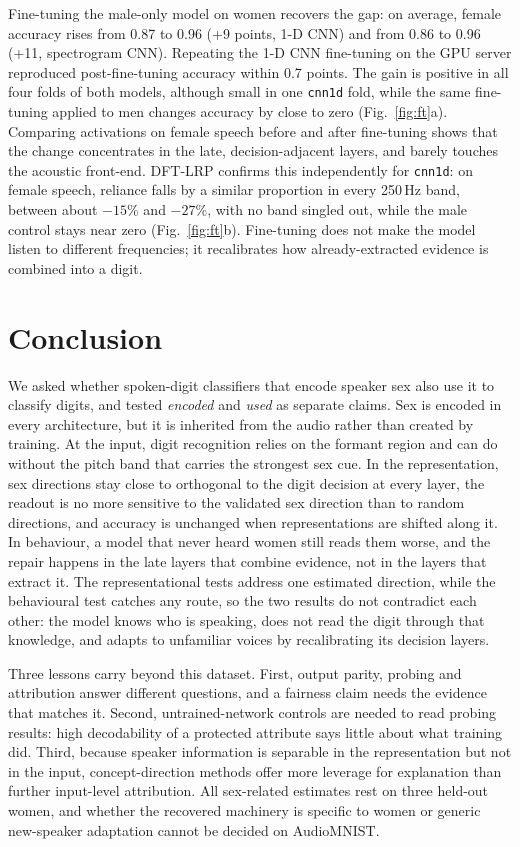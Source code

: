 \documentclass[conference]{IEEEtran}
\begin{document}
Fine-tuning the male-only model on women recovers the gap: on average, female
accuracy rises from 0.87 to 0.96 (+9 points, 1-D CNN) and from 0.86 to 0.96
(+11, spectrogram CNN). Repeating the 1-D CNN fine-tuning on the GPU server
reproduced post-fine-tuning accuracy within 0.7 points. The gain is positive
in all four folds of both models, although small in one \texttt{cnn1d} fold,
while the same fine-tuning applied to men changes accuracy by close to zero
(Fig.~\ref{fig:ft}a). Comparing activations on female speech before and
after fine-tuning shows that the change concentrates in the late,
decision-adjacent layers, and barely touches the acoustic front-end. DFT-LRP
confirms this independently for \texttt{cnn1d}: on female speech, reliance
falls by a similar proportion in every 250\,Hz band, between about $-15\%$
and $-27\%$, with no band singled out, while the male control stays near
zero (Fig.~\ref{fig:ft}b). Fine-tuning does not make the model listen
to different frequencies; it recalibrates how already-extracted evidence is
combined into a digit.

\section{Conclusion}\label{sec:conclusion}

We asked whether spoken-digit classifiers that encode speaker sex also use it
to classify digits, and tested \emph{encoded} and \emph{used} as separate
claims. Sex is encoded in every architecture, but it is inherited from the
audio rather than created by training. At the input, digit recognition relies
on the formant region and can do without the pitch band that carries the
strongest sex cue. In the representation, sex directions stay close to
orthogonal to the digit decision at every layer, the readout is no more
sensitive to the validated sex direction than to random directions, and
accuracy is unchanged when representations are shifted along it. In behaviour, a model that never heard women still reads them
worse, and the repair happens in the late layers that combine evidence, not
in the layers that extract it. The representational tests address one
estimated direction, while the behavioural test catches any route, so the two
results do not contradict each other: the model knows who is speaking, does
not read the digit through that knowledge, and adapts to unfamiliar voices by
recalibrating its decision layers.

Three lessons carry beyond this dataset. First, output parity, probing and
attribution answer different questions, and a fairness claim needs the
evidence that matches it. Second, untrained-network controls are needed to
read probing results: high decodability of a protected attribute says little
about what training did. Third, because speaker information is separable in
the representation but not in the input, concept-direction methods offer more
leverage for explanation than further input-level attribution. All
sex-related estimates rest on three held-out women, and whether the recovered
machinery is specific to women or generic new-speaker adaptation cannot be
decided on AudioMNIST.
\end{document}
